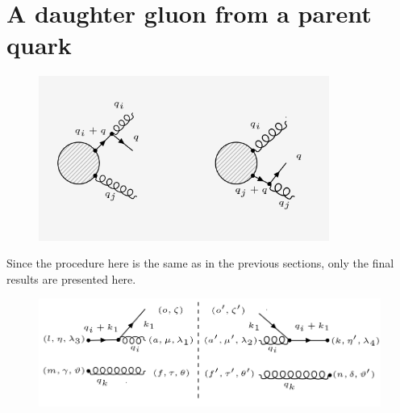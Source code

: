 \section{A daughter gluon from a parent quark}
\begin{figure}[ht!]
\centering
\includegraphics[width=0.85\textwidth]{images/GQ/GQDiagrams.png}
\end{figure}
Since the procedure here is the same as in the previous sections, only the final results are presented here.

\begin{figure}[ht!]
\centering
\includegraphics[scale=0.7]{images/GQ/M1Squer.png}
\end{figure}

